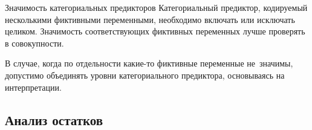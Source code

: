 \documentclass[9pt,pdf,utf8,hyperref={unicode},aspectratio=169]{beamer}
\begin{document}
\begin{frame}{Значимость категориальных предикторов}	
	Категориальный предиктор, кодируемый несколькими фиктивными переменными, необходимо включать или исключать целиком. Значимость соответствующих фиктивных переменных лучше проверять в совокупности.
	
	\bigskip
	
	В случае, когда по отдельности какие-то фиктивные переменные не~значимы, допустимо объединять уровни категориального предиктора, основываясь на интерпретации.
\end{frame}

\subsection{Анализ остатков}
\end{document}

